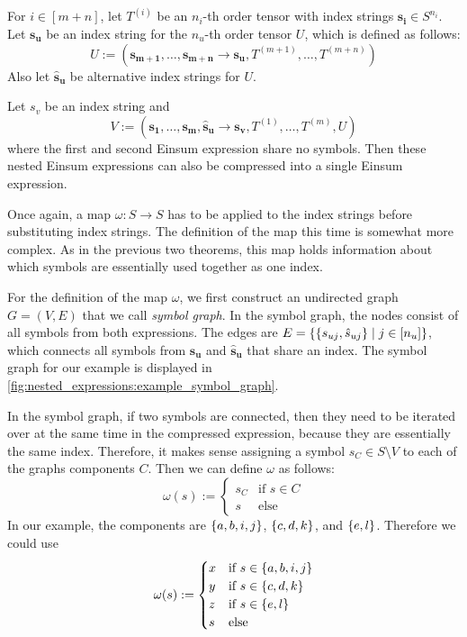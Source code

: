 \begin{theorem}
    \label{thm:nested_einsum:4}
    For $i \in [m + n]$, let $T^{(i)}$ be an $n_i$-th order tensor with index strings $\bm{s_i} \in S^{n_i}$.
    Let $\bm{s_u}$ be an index string for the $n_u$-th order tensor $U$, which is defined as follows:
    $$U := (\bm{s_{m + 1}},\dots,\bm{s_{m + n}} \rightarrow \bm{s_u}, T^{(m + 1)},\dots,T^{(m + n)})$$
    Also let $\bm{\hat{s}_u}$ be alternative index strings for $U$.

    Let $s_v$ be an index string and
    $$V := (\bm{s_1},\dots,\bm{s_m}, \bm{\hat{s}_u} \rightarrow \bm{s_v}, T^{(1)},\dots,T^{(m)}, U)$$
    where the first and second Einsum expression share no symbols.
    Then these nested Einsum expressions can also be compressed into a single Einsum expression.

    Once again, a map $\omega: S \rightarrow S$ has to be applied to the index strings before substituting index strings.
    The definition of the map this time is somewhat more complex.
    As in the previous two theorems, this map holds information about which symbols are essentially used together as one index.

    For the definition of the map $\omega$, we first construct an undirected graph $G = (V, E)$ that we call \textit{symbol graph}.
    In the symbol graph, the nodes consist of all symbols from both expressions.
    The edges are $E = \lbrace \lbrace s_{uj}, \hat{s}_{uj} \rbrace \mid j \in [n_u] \rbrace$,
    which connects all symbols from $\bm{s_u}$ and $\bm{\hat{s}_u}$ that share an index.
    The symbol graph for our example is displayed in \autoref{fig:nested_expressions:example_symbol_graph}.

    In the symbol graph, if two symbols are connected, then they need to be iterated over at the same time in the compressed expression, because they are essentially the same index.
    Therefore, it makes sense assigning a symbol $s_C \in S \setminus V$ to each of the graphs components $C$.
    Then we can define $\omega$ as follows:
    $$\omega(s) := \begin{cases}
            s_C & \text{if } s \in C \\
            s   & \text{else}
        \end{cases}$$
    In our example, the components are $\lbrace a,b,i,j \rbrace$, $\lbrace c,d,k \rbrace$, and $\lbrace e,l \rbrace$.
    Therefore we could use
    $$\omega(s) := \begin{cases}
            x & \text{if } s \in \lbrace a,b,i,j \rbrace \\
            y & \text{if } s \in \lbrace c,d,k \rbrace   \\
            z & \text{if } s \in \lbrace e,l \rbrace     \\
            s & \text{else}
        \end{cases}$$


\end{theorem}
